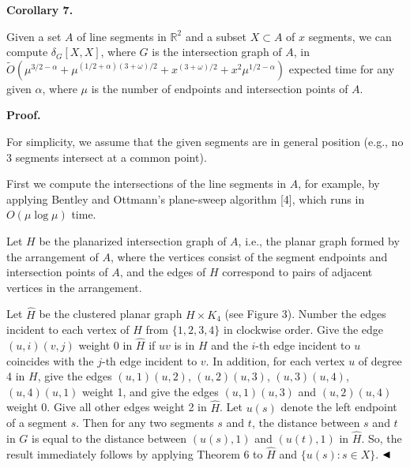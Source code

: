 \par\medskip\noindent\textbf{Corollary 7.}\par
Given a set $A$ of line segments in $\mathbb{R}^{2}$ and a subset $X\subset A$ of $x$ segments, we can compute $\delta_{G}[X,X]$, where $G$ is the intersection graph of $A$, in $\widetilde{O}(\mu^{3/2-\alpha}+\mu^{(1/2+\alpha)(3+\omega)/2}+x^{(3+\omega)/2}%
+x^{2}\mu^{1/2-\alpha})$ expected time for any given $\alpha$, where $\mu$ is the number of endpoints and intersection points of $A$.
\par
\par
\par
\par\medskip\noindent\textbf{Proof.}\par
For simplicity, we assume that the given segments are in general position (e.g., no 3 segments intersect at a common point).
\par
\par
First we compute the intersections of the line segments in $A$, for example, by applying Bentley and Ottmann’s plane-sweep algorithm [4], which runs in $O(\mu\log\mu)$ time.
\par
\par
Let $H$ be the planarized intersection graph of $A$, i.e., the planar graph formed by the arrangement of $A$, where the vertices consist of the segment endpoints and intersection points of $A$, and the edges of $H$ correspond to pairs of adjacent vertices in the arrangement.
\par
\par
Let ${\widehat{H}}$ be the clustered planar graph $H\times K_{4}$ (see Figure 3). Number the edges incident to each vertex of $H$ from $\{1,2,3,4\}$ in clockwise order. Give the edge $(u,i)(v,j)$ weight 0 in ${\widehat{H}}$ if $uv$ is in $H$ and the $i$-th edge incident to $u$ coincides with the $j$-th edge incident to $v$. In addition, for each vertex $u$ of degree 4 in $H$, give the edges $(u,1)(u,2)$, $(u,2)(u,3)$, $(u,3)(u,4)$, $(u,4)(u,1)$ weight 1, and give the edges $(u,1)(u,3)$ and $(u,2)(u,4)$ weight 0. Give all other edges weight 2 in ${\widehat{H}}$. Let $u(s)$ denote the left endpoint of a segment $s$. Then for any two segments $s$ and $t$, the distance between $s$ and $t$ in $G$ is equal to the distance between $(u(s),1)$ and $(u(t),1)$ in ${\widehat{H}}$. So, the result immediately follows by applying Theorem 6 to ${\widehat{H}}$ and $\{u(s):s\in X\}$. $\hfill\blacktriangleleft$
